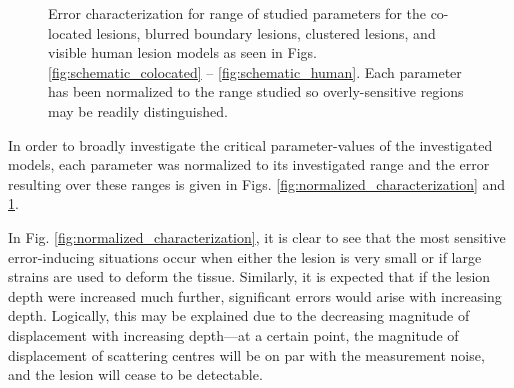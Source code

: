 			\begin{figure}[!t]
				\centering
				\caption[Error characterization for: co-located, blurred boundary, clustered, and visible human lesion models]{Error characterization for range of studied parameters for the co-located lesions, blurred boundary lesions, clustered lesions, and visible human lesion models as seen in Figs. \ref{fig:schematic_colocated} -- \ref{fig:schematic_human}. Each parameter has been normalized to the range studied so overly-sensitive regions may be readily distinguished.}
				\label{fig:normalized_characterization_extras}
			\end{figure}

			In order to broadly investigate the critical parameter-values of the investigated models, each parameter was normalized to its investigated range and the error resulting over these ranges is given in Figs. \ref{fig:normalized_characterization} and \ref{fig:normalized_characterization_extras}.

			In Fig. \ref{fig:normalized_characterization}, it is clear to see that the most sensitive error-inducing situations occur when either the lesion is very small or if large strains are used to deform the tissue. Similarly, it is expected that if the lesion depth were increased much further, significant errors would arise with increasing depth. Logically, this may be explained due to the decreasing magnitude of displacement with increasing depth---at a certain point, the magnitude of displacement of scattering centres will be on par with the measurement noise, and the lesion will cease to be detectable.

